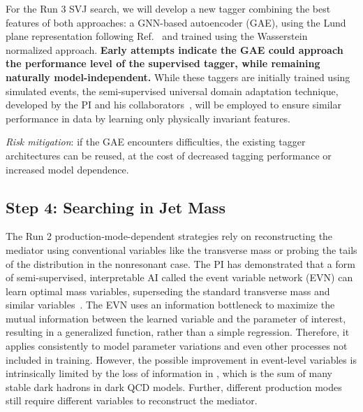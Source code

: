 For the Run 3 SVJ search, we will develop a new tagger combining the best features of both approaches:
a GNN-based autoencoder (GAE), using the Lund plane representation following Ref.~\cite{Dreyer:2020brq} and trained using the Wasserstein normalized approach.
\textbf{Early attempts indicate the GAE could approach the performance level of the supervised tagger, while remaining naturally model-independent.}
While these taggers are initially trained using simulated events,
the semi-supervised universal domain adaptation technique, developed by the PI and his collaborators~\cite{Ciprijanovic:2023hrw},
will be employed to ensure similar performance in data by learning only physically invariant features.

\textit{Risk mitigation}: if the GAE encounters difficulties, the existing tagger architectures can be reused, at the cost of decreased tagging performance or increased model dependence.

\subsection{Step 4: Searching in Jet Mass}\label{subsec:strategy}

The Run 2 production-mode-dependent strategies rely on reconstructing the mediator using conventional variables like the transverse mass
or probing the tails of the \ptmiss distribution in the nonresonant case.
The PI has demonstrated that a form of semi-supervised, interpretable AI called the event variable network (EVN)
can learn optimal mass variables, superseding the standard transverse mass and similar variables~\cite{Pedro:2023sdp}.
The EVN uses an information bottleneck to maximize the mutual information between the learned variable and the parameter of interest,
resulting in a generalized function, rather than a simple regression.
Therefore, it applies consistently to model parameter variations and even other processes not included in training.
However, the possible improvement in event-level variables is intrinsically limited by the loss of information in \ptmiss,
which is the sum of many stable dark hadrons in dark QCD models.
Further, different production modes still require different variables to reconstruct the mediator.

